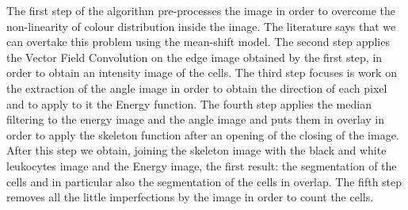 \bigskip


The first step of the algorithm pre-processes the image in order to overcome the non-linearity  of colour distribution inside the image. The literature says that we can overtake this problem using the mean-shift model. The second step applies the Vector Field Convolution on the edge image obtained by the first step, in order to obtain an intensity image of the cells. The third step focuses is work on the extraction of the angle image in order to obtain the direction of each pixel and to apply to it the Energy function. The fourth step applies the median filtering to the energy image and the angle image and puts them in overlay in order to apply the skeleton function after an opening of the closing of the image. After this step we obtain, joining the skeleton image with the black and white leukocytes image and the Energy image, the first result: the segmentation of the cells and in particular also the segmentation of the cells in overlap.
The fifth step removes all the little imperfections by the image in order to count the cells.